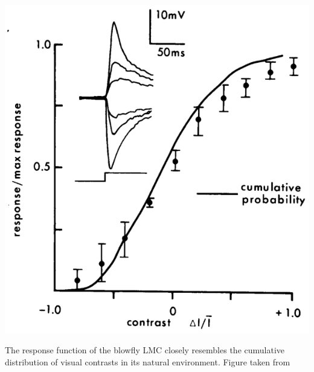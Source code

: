 \begin{marginfigure}
\includegraphics[width=\columnwidth]{figures/laughlin_81.eps}
\label{fig:laughlin}
\caption[Efficient coding in the blowfly LMC.]{The response function of the blowfly LMC closely resembles the cumulative distribution of visual contrasts in its natural environment. Figure taken from }
\end{marginfigure}

